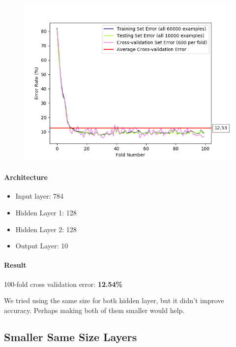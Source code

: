 \documentclass[11pt]{article}
\makeatletter
\def\maxwidth{\ifdim\Gin@nat@width>\linewidth\linewidth
    \else\Gin@nat@width\fi}
\let\Oldincludegraphics\includegraphics
\renewcommand{\includegraphics}[1]{\Oldincludegraphics[width=.8\maxwidth]{#1}}
\providecommand{\tightlist}{%
      \setlength{\itemsep}{0pt}\setlength{\parskip}{0pt}}
\makeatother
\begin{document}
\begin{figure}[htbp]
\centering
\includegraphics{plots/ff-layersize-128-128.png}
\end{figure}

\paragraph{Architecture}\label{architecture-4}

\begin{itemize}
\tightlist
\item
  Input layer: 784
\item
  Hidden Layer 1: 128
\item
  Hidden Layer 2: 128
\item
  Output Layer: 10
\end{itemize}

\paragraph{Result}\label{result-4}

100-fold cross validation error: \textbf{12.54\%}

We tried using the same size for both hidden layer, but it didn't
improve accuracy. Perhaps making both of them smaller would help.

\pagebreak

\subsection{Smaller Same Size Layers}\label{smaller-same-size-layers}
\end{document}
